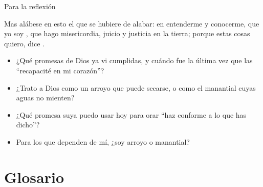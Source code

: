 \begin{frame}{Para la reflexión}
\begin{cita}Mas alábese en esto el que se hubiere de alabar: en entenderme y conocerme, que yo soy \SENOR{}, que hago misericordia, juicio y justicia en la tierra; porque estas cosas quiero, dice \SENOR{}.\end{cita}
\small
\begin{itemize}
\item ¿Qué promesas de Dios ya vi cumplidas, y cuándo fue la última vez que las ``recapacité en mi corazón''?
\item ¿Trato a Dios como un arroyo que puede secarse, o como el manantial cuyas aguas no mienten?
\item ¿Qué promesa suya puedo usar hoy para orar ``haz conforme a lo que has dicho''?
\item Para los que dependen de mí, ¿soy arroyo o manantial?
\end{itemize}
\end{frame}

\section{Glosario}

